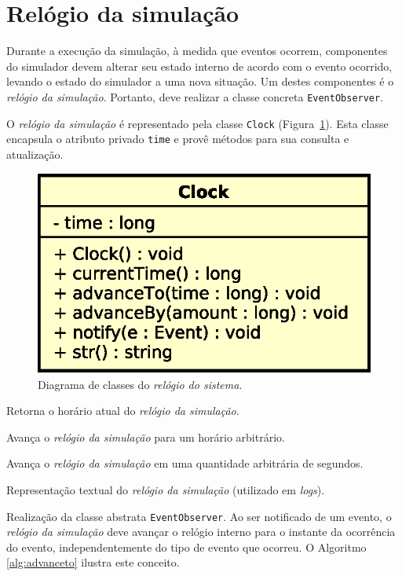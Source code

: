 \section{Relógio da simulação} Durante a execução da simulação, à medida que
eventos ocorrem, componentes do simulador devem alterar seu estado interno de
acordo com o evento ocorrido, levando o estado do simulador a uma nova situação.
Um destes componentes é o \textit{relógio da simulação}. Portanto, deve realizar
a classe concreta \texttt{EventObserver}.

O \textit{relógio da simulação} é representado pela classe \texttt{Clock}
(Figura~\ref{fig:diagram:clock}). Esta classe encapsula o atributo privado
\texttt{time} e provê métodos para sua consulta e atualização.

\begin{figure}[htb!]
  \centering
  \includegraphics[scale=0.6]{img/Clock}
  \caption{Diagrama de classes do \textit{relógio do sistema}.}
\label{fig:diagram:clock}
\end{figure}

\begin{description}[leftmargin=!,labelwidth=\widthof{\bfseries currentTime}]
  \item[\texttt{currentTime}] Retorna o horário atual do \textit{relógio da simulação}.
  \item[\texttt{advanceTo}] Avança o \textit{relógio da simulação} para um horário arbitrário.
  \item[\texttt{advanceBy}] Avança o \textit{relógio da simulação} em uma quantidade arbitrária de segundos.
  \item[\texttt{str}] Representação textual do \textit{relógio da simulação} (utilizado em \textit{logs}).
  \item[\texttt{notify}]
  Realização da classe abstrata \texttt{EventObserver}. Ao ser notificado de um
  evento, o \textit{relógio da simulação} deve avançar o relógio interno para o
  instante da ocorrência do evento, independentemente do tipo de evento que
  ocorreu. O Algoritmo \ref{alg:advanceto} ilustra este conceito.
\end{description}

